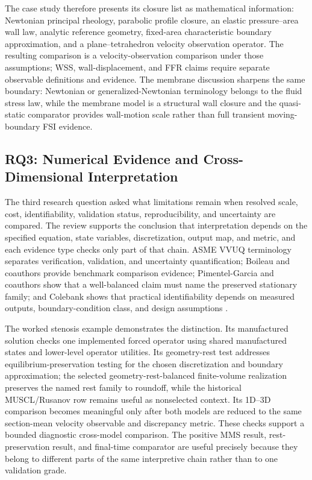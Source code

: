 The case study therefore presents its closure list as mathematical information:
Newtonian principal rheology, parabolic profile closure, an elastic
pressure--area wall law, analytic reference geometry, fixed-area characteristic
boundary approximation, and a plane--tetrahedron velocity observation operator.
The resulting comparison is a velocity-observation comparison under those
assumptions; WSS, wall-displacement, and FFR claims require separate observable
definitions and evidence.
The membrane discussion sharpens the same boundary: Newtonian or
generalized-Newtonian terminology belongs to the fluid stress law, while the
membrane model is a structural wall closure and the quasi-static comparator
provides wall-motion scale rather than full transient moving-boundary FSI
evidence.

\subsection{RQ3: Numerical Evidence and Cross-Dimensional Interpretation}
\label{subsec:discussion-numerical-evidence-observation}

The third research question asked what limitations remain when resolved scale,
cost, identifiability, validation status, reproducibility, and uncertainty are
compared. The review supports the conclusion that interpretation depends on the
specified equation, state variables, discretization, output map, and metric, and
each evidence type checks only part of that chain.
ASME VVUQ terminology separates verification, validation, and uncertainty
quantification; Boileau and coauthors provide benchmark comparison evidence;
Pimentel-Garcia and coauthors show that a well-balanced claim must name the
preserved stationary family; and Colebank shows that practical identifiability
depends on measured outputs, boundary-condition class, and design assumptions
\cite{ASME2022VVUQTerminology,BoileauEtAl2015Benchmark,PimentelGarciaEtAl2023HighOrderWellBalanced,Colebank2025HemodynamicsIdentifiability}.

The worked stenosis example demonstrates the distinction. Its manufactured
solution checks one implemented forced operator using shared manufactured
states and lower-level operator utilities. Its geometry-rest test addresses
equilibrium-preservation testing for the chosen discretization and boundary
approximation; the selected geometry-rest-balanced finite-volume realization
preserves the named rest family to roundoff, while the historical MUSCL/Rusanov
row remains useful as nonselected context. Its 1D--3D comparison becomes
meaningful only after both models are reduced to the same section-mean velocity
observable and discrepancy metric. These checks support a bounded diagnostic
cross-model comparison. The positive MMS result, rest-preservation result, and
final-time comparator are useful precisely because they belong to different
parts of the same interpretive chain rather than to one validation grade.

